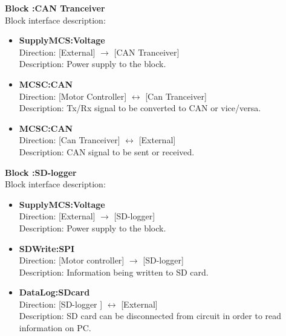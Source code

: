 \textbf{Block :CAN Tranceiver}\\
Block interface description:
\begin{itemize}
	\item \textbf{SupplyMCS:Voltage}\\
	Direction: [External] $\rightarrow$ [CAN Tranceiver]\\
	Description: Power supply to the block.
	\item \textbf{MCSC:CAN}\\
	Direction: [Motor Controller] $\leftrightarrow$ [Can Tranceiver]\\
	Description: Tx/Rx signal to be converted to CAN or vice/versa.
	\item \textbf{MCSC:CAN}\\
	Direction: [Can Tranceiver] $\leftrightarrow$ [External]\\
	Description: CAN signal to be sent or received.
\end{itemize}

\textbf{Block :SD-logger}\\
Block interface description:
\begin{itemize}
	\item \textbf{SupplyMCS:Voltage}\\
	Direction: [External] $\rightarrow$ [SD-logger]\\
	Description: Power supply to the block.
	\item \textbf{SDWrite:SPI}\\
	Direction: [Motor controller] $\rightarrow$ [SD-logger]\\
	Description: Information being written to SD card.
	\item \textbf{DataLog:SDcard}\\
	Direction: [SD-logger ] $\leftrightarrow$ [External]\\
	Description: SD card can be disconnected from circuit in order to read information on PC.
\end{itemize}